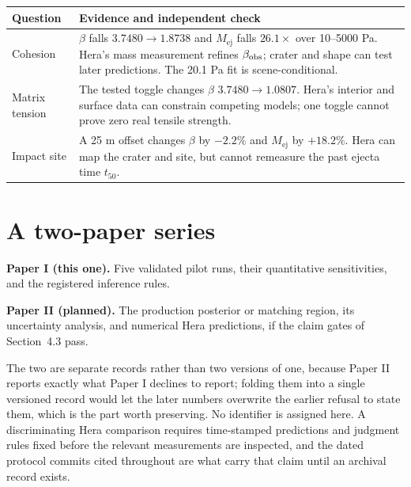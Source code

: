 \documentclass[10pt,twocolumn]{article}
\newcommand{\Mej}{M_{\mathrm{ej}}}
\begin{document}
\noindent\begin{minipage}{\columnwidth}
\centering
\captionsetup{hypcap=false}
\label{tab:hera}
\footnotesize
\renewcommand{\arraystretch}{1.16}
\begin{tabular}{@{}>{\raggedright\arraybackslash}p{19mm}>{\raggedright\arraybackslash}p{59mm}@{}}
\toprule
Question & Evidence and independent check\\
\midrule
Cohesion & $\beta$ falls $3.7480\to1.8738$ and $\Mej$
falls $26.1\times$ over 10--5000 Pa. Hera's mass measurement
refines $\beta_{\rm obs}$; crater and shape can test later
predictions. The 20.1 Pa fit is scene-conditional.\\
\addlinespace[2pt]
Matrix tension & The tested toggle changes $\beta$
$3.7480\to1.0807$. Hera's interior and surface data can
constrain competing models; one toggle cannot prove zero
real tensile strength.\\
\addlinespace[2pt]
Impact site & A 25 m offset changes $\beta$ by $-2.2\%$
and $\Mej$ by $+18.2\%$. Hera can map the crater and site,
but cannot remeasure the past ejecta time $t_{50}$.\\
\bottomrule
\end{tabular}
\end{minipage}

\section*{A two-paper series}
\textbf{Paper I (this one).} Five validated pilot runs, their
quantitative sensitivities, and the registered inference rules.

\par\smallskip\noindent
\textbf{Paper II (planned).} The production posterior or matching
region, its uncertainty analysis, and numerical Hera predictions, if
the claim gates of Section~4.3 pass.

\par\smallskip\noindent
The two are separate records rather than two versions of one, because
Paper II reports exactly what Paper I declines to report; folding them
into a single versioned record would let the later numbers overwrite
the earlier refusal to state them, which is the part worth preserving.
No identifier is assigned here. A discriminating Hera comparison
requires time-stamped predictions and judgment rules fixed before the
relevant measurements are inspected, and the dated protocol commits
cited throughout are what carry that claim until an archival record
exists.
\end{document}
